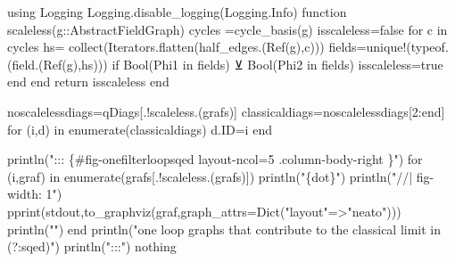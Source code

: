 \documentclass[
  11pt,
  a4paper,
  DIV=11,
  numbers=noendperiod,
  twoside]{scrreprt}
\newenvironment{Shaded}{\begin{snugshade}}{\end{snugshade}}
\newcommand{\BuiltInTok}[1]{\textcolor[rgb]{0.00,0.23,0.31}{#1}}
\newcommand{\ConstantTok}[1]{\textcolor[rgb]{0.56,0.35,0.01}{#1}}
\newcommand{\ControlFlowTok}[1]{\textcolor[rgb]{0.00,0.23,0.31}{#1}}
\newcommand{\DataTypeTok}[1]{\textcolor[rgb]{0.68,0.00,0.00}{#1}}
\newcommand{\FloatTok}[1]{\textcolor[rgb]{0.68,0.00,0.00}{#1}}
\newcommand{\FunctionTok}[1]{\textcolor[rgb]{0.28,0.35,0.67}{#1}}
\newcommand{\ImportTok}[1]{\textcolor[rgb]{0.00,0.46,0.62}{#1}}
\newcommand{\KeywordTok}[1]{\textcolor[rgb]{0.00,0.23,0.31}{#1}}
\newcommand{\NormalTok}[1]{\textcolor[rgb]{0.00,0.23,0.31}{#1}}
\newcommand{\OperatorTok}[1]{\textcolor[rgb]{0.37,0.37,0.37}{#1}}
\newcommand{\StringTok}[1]{\textcolor[rgb]{0.13,0.47,0.30}{#1}}
\DeclareRobustCommand{\[}{\begin{equation}}
\DeclareRobustCommand{\]}{\end{equation}}
\begin{document}
\begin{Shaded}
\begin{Highlighting}[]
\ImportTok{using} \BuiltInTok{Logging}
\BuiltInTok{Logging}\NormalTok{.}\FunctionTok{disable\_logging}\NormalTok{(}\BuiltInTok{Logging}\NormalTok{.Info)}
\KeywordTok{function} \FunctionTok{scaleless}\NormalTok{(g}\OperatorTok{::}\DataTypeTok{AbstractFieldGraph}\NormalTok{)}
\NormalTok{  cycles }\OperatorTok{=}\FunctionTok{cycle\_basis}\NormalTok{(g)}
\NormalTok{  isscaleless}\OperatorTok{=}\ConstantTok{false}
  \ControlFlowTok{for}\NormalTok{ c }\KeywordTok{in}\NormalTok{ cycles}
\NormalTok{    hs}\OperatorTok{=} \FunctionTok{collect}\NormalTok{(}\BuiltInTok{Iterators}\NormalTok{.}\FunctionTok{flatten}\NormalTok{(}\FunctionTok{half\_edges}\NormalTok{.(}\FunctionTok{Ref}\NormalTok{(g),c)))}
\NormalTok{    fields}\OperatorTok{=}\FunctionTok{unique!}\NormalTok{(}\FunctionTok{typeof}\NormalTok{.(}\FunctionTok{field}\NormalTok{.(}\FunctionTok{Ref}\NormalTok{(g),hs)))}
    \ControlFlowTok{if} \FunctionTok{Bool}\NormalTok{(Phi1 }\KeywordTok{in}\NormalTok{ fields) }\OperatorTok{⊻}  \FunctionTok{Bool}\NormalTok{(Phi2 }\KeywordTok{in}\NormalTok{ fields)}
\NormalTok{      isscaleless}\OperatorTok{=}\ConstantTok{true}
    \ControlFlowTok{end}
  \ControlFlowTok{end}
  \ControlFlowTok{return}\NormalTok{ isscaleless}
\KeywordTok{end}

\NormalTok{noscalelessdiags}\OperatorTok{=}\NormalTok{qDiags[.!}\FunctionTok{scaleless}\NormalTok{.(grafs)]}
\NormalTok{classicaldiags}\OperatorTok{=}\NormalTok{noscalelessdiags[}\FloatTok{2}\OperatorTok{:}\KeywordTok{end}\NormalTok{]}
\ControlFlowTok{for}\NormalTok{ (i,d) }\KeywordTok{in} \FunctionTok{enumerate}\NormalTok{(classicaldiags)}
\NormalTok{  d.ID}\OperatorTok{=}\NormalTok{i}
\ControlFlowTok{end}

\FunctionTok{println}\NormalTok{(}\StringTok{"::: \{\#fig{-}onefilterloopsqed  layout{-}ncol=5 .column{-}body{-}right \}"}\NormalTok{)}
\ControlFlowTok{for}\NormalTok{ (i,graf) }\KeywordTok{in} \FunctionTok{enumerate}\NormalTok{(grafs[.!}\FunctionTok{scaleless}\NormalTok{.(grafs)])}
\FunctionTok{println}\NormalTok{(}\StringTok{"\textasciigrave{}\textasciigrave{}\textasciigrave{}\{dot\}"}\NormalTok{)}
\FunctionTok{println}\NormalTok{(}\StringTok{"//| fig{-}width: 1"}\NormalTok{)}
    \FunctionTok{pprint}\NormalTok{(}\ConstantTok{stdout}\NormalTok{,}\FunctionTok{to\_graphviz}\NormalTok{(graf,graph\_attrs}\OperatorTok{=}\FunctionTok{Dict}\NormalTok{(}\StringTok{"layout"}\OperatorTok{=\textgreater{}}\StringTok{"neato"}\NormalTok{)))}
    \FunctionTok{println}\NormalTok{(}\StringTok{"\textasciigrave{}\textasciigrave{}\textasciigrave{}"}\NormalTok{)}
\ControlFlowTok{end}
\FunctionTok{println}\NormalTok{(}\StringTok{"one loop graphs that contribute to the classical limit in (?:sqed)"}\NormalTok{)}
\FunctionTok{println}\NormalTok{(}\StringTok{":::"}\NormalTok{)}
\ConstantTok{nothing}
\end{Highlighting}
\end{Shaded}
\end{document}
